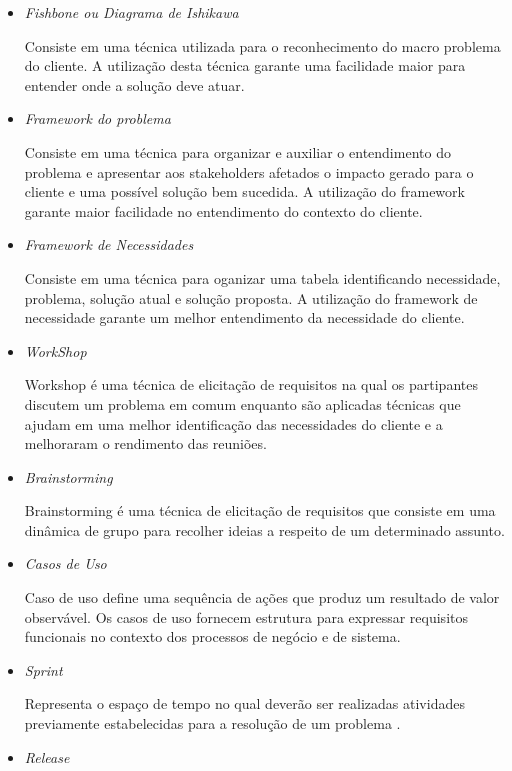\begin{itemize}
	\item \textit{Fishbone ou Diagrama de Ishikawa}

		Consiste em uma técnica utilizada para o reconhecimento do macro problema do cliente. A utilização desta técnica garante uma facilidade maior para entender onde a solução deve atuar.

	\item \textit{Framework do problema}

		Consiste em uma técnica para organizar e auxiliar o entendimento do problema e apresentar aos stakeholders afetados o impacto gerado para o cliente e uma possível solução bem sucedida. A utilização do framework garante maior facilidade no entendimento do contexto do cliente.

	\item \textit{Framework de Necessidades}

		Consiste em uma técnica para oganizar uma tabela identificando necessidade, problema, solução atual e solução proposta. A utilização do framework de necessidade garante um melhor entendimento da necessidade do cliente.
 
	\item \textit{WorkShop}

		 Workshop é uma técnica de elicitação de requisitos na qual os partipantes discutem um problema em comum enquanto são aplicadas técnicas que ajudam em uma melhor identificação das necessidades do cliente e a melhoraram o rendimento das reuniões.

	\item \textit{Brainstorming}

		 Brainstorming é uma técnica de elicitação de requisitos que consiste em uma dinâmica de grupo para recolher ideias a respeito de um determinado assunto.

	\item \textit{Casos de Uso}

		 Caso de uso define uma sequência de ações que produz um resultado de valor observável. Os casos de uso fornecem estrutura para expressar requisitos funcionais no contexto dos processos de negócio e de sistema.

	\item \textit{Sprint}

		Representa o espaço de tempo no qual deverão ser realizadas atividades previamente estabelecidas para a resolução de um problema \cite{beck2000extreme}.

	\item \textit{Release}


\end{itemize}
